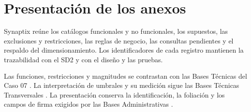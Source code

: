 \documentclass[11pt,letterpaper]{report}
\begin{document}
\setcounter{chapter}{2}
\renewcommand{\thetable}{A2.\arabic{table}}

\tableofcontents

\chapter*{Presentación de los anexos}
Synaptix reúne los catálogos funcionales y no funcionales, los supuestos,
las exclusiones y restricciones, las reglas de negocio, las consultas
pendientes y el respaldo del dimensionamiento. Los identificadores de cada
registro mantienen la trazabilidad con el SD2 y con el diseño y las pruebas.

Las funciones, restricciones y magnitudes se contrastan con las Bases Técnicas
del Caso 07 \parencite[caps.~10--15, pp.~26--36]{pucv-caso07-2026}.
La interpretación de umbrales y su medición sigue las Bases Técnicas
Transversales \parencite[secc.~1.7, p.~5; cap.~9, p.~21]{pucv-bases-transversales-2026}.
La presentación conserva la identificación, la foliación y los campos de firma
exigidos por las Bases Administrativas \parencite[art.~40, p.~26]{pucv-bases-administrativas-2026}.

\begin{paginaHorizontalSynaptix}

\end{paginaHorizontalSynaptix}

\CierreSubdocumento
\end{document}
